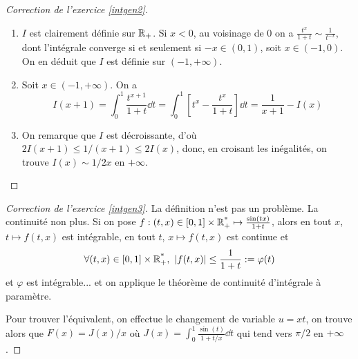 \begin{proof}[Correction de l'exercice \ref{intgen2}]
	\begin{enumerate}
		\item $I$ est clairement définie sur $\operatorname{\mathbb R}_+$. 
		Si $x<0$, au voisinage de $0$ on a $\frac{t^x}{1+t}\sim\frac1{t^{-x}}$, dont l'intégrale converge si et seulement si $-x\in(0,1)$, soit $x\in(-1,0)$.
		On en déduit que $I$ est définie sur $(-1,+\infty)$.
		
		\item Soit $x\in(-1,+\infty)$.
		On a 
		\[
			I(x+1)=\int_0^1\frac{t^{x+1}}{1+t}\dd t = \int_0^1\left[t^x-\frac{t^x}{1+t}\right]\dd t=\frac1{x+1}-I(x)
		\]
		\item On remarque que $I$ est décroissante, d'où $2I(x+1)\leq1/(x+1)\leq2 I(x)$, donc, en croisant les inégalités, on trouve $I(x)\sim 1/2x$ en $+\infty$.
	\end{enumerate}
\end{proof}

\begin{proof}[Correction de l'exercice \ref{intgen3}]
	La définition n'est pas un problème. La continuité non plus. 
	Si on pose $f:(t,x)\in[0,1]\times\operatorname{\mathbb R_+^*}\mapsto \frac{\sin(tx)}{1+t}$, alors en tout $x$, $t\mapsto f(t,x)$ est intégrable, en tout $t$, $x\mapsto f(t,x)$ est continue et 
	\[
		\forall (t,x)\in[0,1]\times\operatorname{\mathbb R_+^*},\ |f(t,x)|\leq\frac1{1+t}:=\varphi(t)
	\]
	et $\varphi$ est intégrable... et on applique le théorème de continuité d'intégrale à paramètre.

	Pour trouver l'équivalent, on effectue le changement de variable $u=xt$, on trouve alors que $F(x)=J(x)/x$ 
	où $J(x)=\int_{0}^1\frac{\sin(t)}{1+t/x}\dd t$ qui tend vers $\pi/2$ en $+\infty$.
\end{proof}


